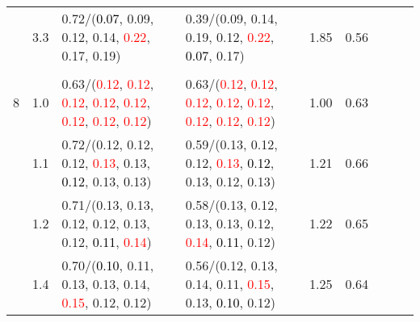 \documentclass[10pt,a4paper]{report}
\begin{document}
\begin{table}[!htbp]
\begin{center}
{\begin{tabular}{ccllccccc}
				  & 3.3                               & 0.72/(\textcolor{black}{0.07}, 0.09, 0.12, 0.14, \textcolor{red}{0.22}, 0.17, 0.19)                                                                                                           & 0.39/(0.09, 0.14, 0.19, 0.12, \textcolor{red}{0.22}, \textcolor{black}{0.07}, 0.17)                                                                                                           & 1.85             & 0.56                     \\
				  &                                   &                                                                                                                                                                                               &                                                                                                                                                                                               &                                             \\
				8 & 1.0                               & 0.63/(\textcolor{red}{0.12}, \textcolor{red}{0.12}, \textcolor{red}{0.12}, \textcolor{red}{0.12}, \textcolor{red}{0.12}, \textcolor{red}{0.12}, \textcolor{red}{0.12}, \textcolor{red}{0.12}) & 0.63/(\textcolor{red}{0.12}, \textcolor{red}{0.12}, \textcolor{red}{0.12}, \textcolor{red}{0.12}, \textcolor{red}{0.12}, \textcolor{red}{0.12}, \textcolor{red}{0.12}, \textcolor{red}{0.12}) & 1.00             & 0.63                     \\
				  & 1.1                               & 0.72/(0.12, 0.12, 0.12, \textcolor{red}{0.13}, 0.13, \textcolor{black}{0.12}, 0.13, 0.13)                                                                                                     & 0.59/(0.13, 0.12, 0.12, \textcolor{red}{0.13}, \textcolor{black}{0.12}, 0.13, 0.12, 0.13)                                                                                                     & 1.21             & 0.66                     \\
				  & 1.2                               & 0.71/(0.13, 0.13, 0.12, 0.12, 0.13, 0.12, \textcolor{black}{0.11}, \textcolor{red}{0.14})                                                                                                     & 0.58/(0.13, 0.12, 0.13, 0.13, 0.12, \textcolor{red}{0.14}, \textcolor{black}{0.11}, 0.12)                                                                                                     & 1.22             & 0.65                     \\
				  & 1.4                               & 0.70/(\textcolor{black}{0.10}, 0.11, 0.13, 0.13, 0.14, \textcolor{red}{0.15}, 0.12, 0.12)                                                                                                     & 0.56/(0.12, 0.13, 0.14, 0.11, \textcolor{red}{0.15}, 0.13, \textcolor{black}{0.10}, 0.12)                                                                                                     & 1.25             & 0.64                     \\

\end{tabular}}
\end{center}
\end{table}
\end{document}
